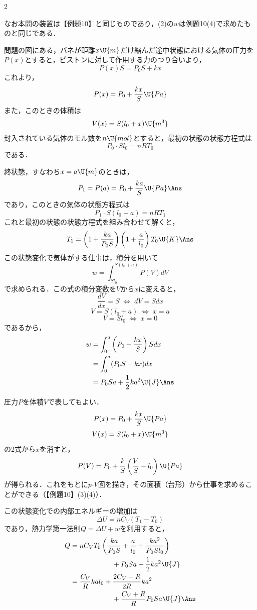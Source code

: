 \begin{multicols}{2}
\begin{sisin}
なお本問の装置は【例題10】と同じものであり，(2)の$w$は例題10(4)で求めたものと同じである．
\end{sisin}
\KaiHead
問題の図にある，バネが距離$x\U{m}$だけ縮んだ途中状態における気体の圧力を$P(x)$とすると，ピストンに対して作用する力のつり合いより，
\[P(x)S=P_0S+kx\]
これより，
\[P(x)=P_0+\frac{kx}{S}\U{Pa}\]
また，このときの体積は
\[V(x)=S(l_0+x)\U{m^3}\]
封入されている気体のモル数を$n\U{mol}$とすると，最初の状態の状態方程式は
\[P_0\cdot Sl_0=nRT_0\]
である．
\begin{komon}
 終状態，すなわち$x=a\U{m}$のときは，
       \[P_1=P(a)=P_0+\frac{ka}{S}\U{Pa}\Ans\]
       であり，このときの気体の状態方程式は
       \[P_1\cdot S(l_0+a)=nRT_1\]
       これと最初の状態の状態方程式を組み合わせて解くと，
       \[T_1=\left(1+\frac{ka}{P_0S}\right)\left(1+\frac{a}{l_0}\right)T_0\U{K}\Ans\]
 この状態変化で気体がする仕事は，積分を用いて
       \[w=\int_{Sl_0}^{S(l_0+a)}P(V)dV\]
       で求められる．この式の積分変数を$V$から$x$に変えると，
       \[\frac{dV}{dx}=S\;\Leftrightarrow\;dV=Sdx\]
       \[V=S(l_0+a)\;\Leftrightarrow\;x=a\]
       \[V=Sl_0\;\Leftrightarrow\;x=0\]
       であるから，
       \[\begin{aligned}
         w&=\int_0^a\left(P_0+\frac{kx}{S}\right)Sdx\\
          &=\int_0^a(P_0S+kx)dx\\
          &=P_0Sa+\frac{1}{2}ka^2\U{J}\Ans
       \end{aligned}\]
       \begin{chuu}
       圧力$P$を体積$V$で表してもよい．
       \[P(x)=P_0+\frac{kx}{S}\U{Pa}\]
       \[V(x)=S(l_0+x)\U{m^3}\]
       の2式から$x$を消すと，
       \[P(V)=P_0+\frac{k}{S}\left(\frac{V}{S}-l_0\right)\U{Pa}\]
       が得られる．これをもとに$p$-$V$図を描き，その面積（台形）から仕事を求めることができる（【例題10】(3)(4)）．
       \end{chuu}
 この状態変化での内部エネルギーの増加は
       \[\Delta U=nC_V(T_1-T_0)\]
       であり，熱力学第一法則$Q=\Delta U+w$を利用すると，
       \[\begin{aligned}
         Q&=nC_VT_0\left(\frac{ka}{P_0S}+\frac{a}{l_0}+\frac{ka^2}{P_0Sl_0}\right)\\
          &\qquad\qquad\qquad+P_0Sa+\frac{1}{2}ka^2\U{J}\\
          &=\frac{C_V}{R}kal_0+\frac{2C_V+R}{2R}ka^2\\
          &\qquad\qquad\qquad+\frac{C_V+R}{R}P_0Sa\U{J}\Ans
       \end{aligned}\]
\end{komon}

\end{multicols}
